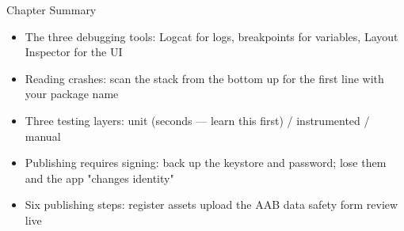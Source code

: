 \begin{tcbsummary}{Chapter Summary}
\begin{itemize}
  \item The three debugging tools: Logcat for logs, breakpoints for variables, Layout Inspector for the UI
  \item Reading crashes: scan the stack from the bottom up for the first line with your package name
  \item Three testing layers: unit (seconds — learn this first) / instrumented / manual
  \item Publishing requires signing: back up the keystore and password; lose them and the app "changes identity"
  \item Six publishing steps: register assets upload the AAB data safety form review live
\end{itemize}

\end{tcbsummary}
